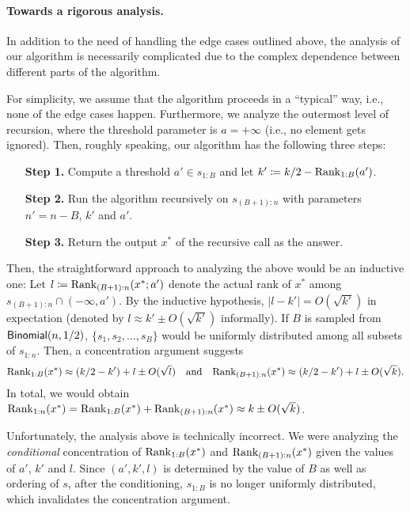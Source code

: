 \paragraph{Towards a rigorous analysis.} In addition to the need of handling the edge cases outlined above, the analysis of our algorithm is necessarily complicated due to the complex dependence between different parts of the algorithm.

For simplicity, we assume that the algorithm proceeds in a ``typical'' way, i.e., none of the edge cases happen. Furthermore, we analyze the outermost level of recursion, where the threshold parameter is $a = +\infty$ (i.e., no element gets ignored). Then, roughly speaking, our algorithm has the following three steps:
\begin{enumerate}
    \item[\textbf{Step 1.}] Compute a threshold $a' \in s_{1:B}$ and let $k' \coloneqq k/2 - \mathrm{Rank}_{1:B}(a')$.
    \item[\textbf{Step 2.}] Run the algorithm recursively on $s_{(B+1):n}$ with parameters $n' = n - B$, $k'$ and $a'$.
    \item[\textbf{Step 3.}] Return the output $x^*$ of the recursive call as the answer.
\end{enumerate}

Then, the straightforward approach to analyzing the above would be an inductive one: Let $l \coloneqq \mathrm{Rank}_{(B+1):n}(x^*; a')$ denote the actual rank of $x^*$ among $s_{(B+1):n} \cap (-\infty, a')$. By the inductive hypothesis, $|l - k'| = O(\sqrt{k'})$ in expectation (denoted by $l \approx k' \pm O(\sqrt{k'})$ informally). If $B$ is sampled from $\mathsf{Binomial}(n, 1/2)$, $\{s_1, s_2, \ldots, s_B\}$ would be uniformly distributed among all subsets of $s_{1:n}$. Then, a concentration argument suggests
\begin{equation}\label{eq:overview-concentration}
    \mathrm{Rank}_{1:B}(x^*) \approx (k/2 - k') + l \pm O(\sqrt{l})
\quad\text{and}\quad
    \mathrm{Rank}_{(B+1):n}(x^*) \approx (k/2 - k') + l \pm O(\sqrt{k}).
\end{equation}
In total, we would obtain $\mathrm{Rank}_{1:n}(x^*) = \mathrm{Rank}_{1:B}(x^*) + \mathrm{Rank}_{(B+1):n}(x^*) \approx k \pm O(\sqrt{k})$.

Unfortunately, the analysis above is technically incorrect. We were analyzing the \emph{conditional} concentration of $\mathrm{Rank}_{1:B}(x^*)$ and $\mathrm{Rank}_{(B+1):n}(x^*)$ given the values of $a'$, $k'$ and $l$. Since $(a', k', l)$ is determined by the value of $B$ as well as ordering of $s$, after the conditioning, $s_{1:B}$ is no longer uniformly distributed, which invalidates the concentration argument.


